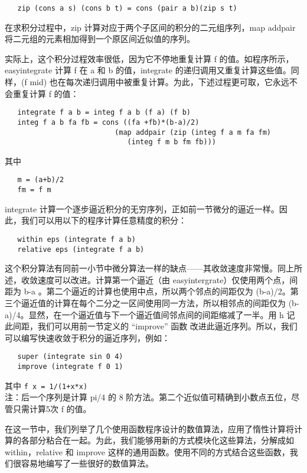 \documentclass[12pt]{article}
\begin{document}
\begin{verbatim}
   zip (cons a s) (cons b t) = cons (pair a b)(zip s t)
\end{verbatim}

在求积分过程中，zip 计算对应于两个子区间的积分的二元组序列，map addpair 将二元组的元素相加得到一个原区间近似值的序列。

实际上，这个积分过程效率很低，因为它不停地重复计算 f 的值。如程序所示，easyintegrate 计算 f 在 a 和 b 的值，integrate 的递归调用又重复计算这些值。同样，(f mid) 也在每次递归调用中被重复计算。为此，下述过程更可取，它永远不会重复计算 f 的值：

\begin{verbatim}
   integrate f a b = integ f a b (f a) (f b)
   integ f a b fa fb = cons ((fa +fb)*(b-a)/2)
                          (map addpair (zip (integ f a m fa fm)
                             (integ f m b fm fb)))
\end{verbatim}
   
其中

\begin{verbatim}
   m = (a+b)/2
   fm = f m
\end{verbatim}

integrate 计算一个逐步逼近积分的无穷序列，正如前一节微分的逼近一样。因此，我们可以用以下的程序计算任意精度的积分：

\begin{verbatim}
   within eps (integrate f a b)
   relative eps (integrate f a b)
\end{verbatim}

这个积分算法有同前一小节中微分算法一样的缺点——其收敛速度非常慢。同上所述，收敛速度可以改进。计算第一个逼近（由 easyintergrate）仅使用两个点，间距为 b-a 。第二个逼近的计算也使用中点，所以两个邻点的间距仅为 (b-a)/2。第三个逼近值的计算在每个二分之一区间使用同一方法，所以相邻点的间距仅为 (b-a)/4。显然，在一个逼近值与下一个逼近值间邻点间的间距缩减了一半。用 h 记此间距，我们可以用前一节定义的 ``improve'' 函数 改进此逼近序列。所以，我们可以编写快速收敛于积分的逼近序列，例如：

\begin{verbatim}
   super (integrate sin 0 4)
   improve (integrate f 0 1)
\end{verbatim}

其中 \verb"f x = 1/(1+x*x)"\\

注：后一个序列是计算 pi/4 的 8 阶方法。第二个近似值可精确到小数点五位，尽管只需计算5次 f 的值。

在这一节中，我们列举了几个使用函数程序设计的数值算法，应用了惰性计算将计算的各部分粘合在一起。为此，我们能够用新的方式模块化这些算法，分解成如 within，relative 和 improve 这样的通用函数。使用不同的方式结合这些函数，我们很容易地编写了一些很好的数值算法。
\end{document}
